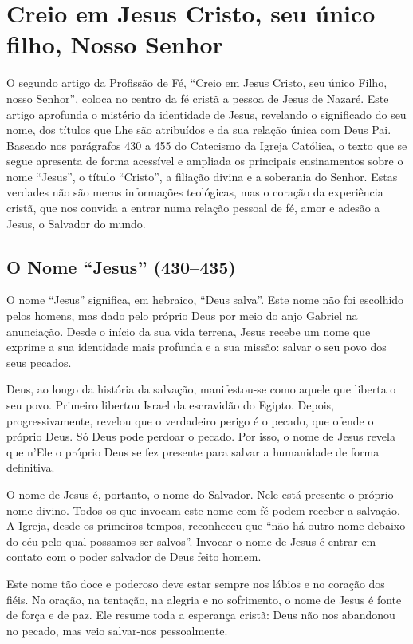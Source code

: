 \chapter{Creio em Jesus Cristo, seu único filho, Nosso Senhor}

O segundo artigo da Profissão de Fé, ``Creio em Jesus Cristo, seu único Filho, nosso Senhor'', coloca no centro da fé cristã a pessoa de Jesus de Nazaré. Este artigo aprofunda o mistério da identidade de Jesus, revelando o significado do seu nome, dos títulos que Lhe são atribuídos e da sua relação única com Deus Pai. Baseado nos parágrafos 430 a 455 do Catecismo da Igreja Católica, o texto que se segue apresenta de forma acessível e ampliada os principais ensinamentos sobre o nome ``Jesus'', o título ``Cristo'', a filiação divina e a soberania do Senhor. Estas verdades não são meras informações teológicas, mas o coração da experiência cristã, que nos convida a entrar numa relação pessoal de fé, amor e adesão a Jesus, o Salvador do mundo.

\section{O Nome ``Jesus'' (430--435)}

O nome ``Jesus'' significa, em hebraico, ``Deus salva''. Este nome não foi escolhido pelos homens, mas dado pelo próprio Deus por meio do anjo Gabriel na anunciação. Desde o início da sua vida terrena, Jesus recebe um nome que exprime a sua identidade mais profunda e a sua missão: salvar o seu povo dos seus pecados.

Deus, ao longo da história da salvação, manifestou-se como aquele que liberta o seu povo. Primeiro libertou Israel da escravidão do Egipto. Depois, progressivamente, revelou que o verdadeiro perigo é o pecado, que ofende o próprio Deus. Só Deus pode perdoar o pecado. Por isso, o nome de Jesus revela que n’Ele o próprio Deus se fez presente para salvar a humanidade de forma definitiva.

O nome de Jesus é, portanto, o nome do Salvador. Nele está presente o próprio nome divino. Todos os que invocam este nome com fé podem receber a salvação. A Igreja, desde os primeiros tempos, reconheceu que ``não há outro nome debaixo do céu pelo qual possamos ser salvos''. Invocar o nome de Jesus é entrar em contato com o poder salvador de Deus feito homem.

Este nome tão doce e poderoso deve estar sempre nos lábios e no coração dos fiéis. Na oração, na tentação, na alegria e no sofrimento, o nome de Jesus é fonte de força e de paz. Ele resume toda a esperança cristã: Deus não nos abandonou no pecado, mas veio salvar-nos pessoalmente.

